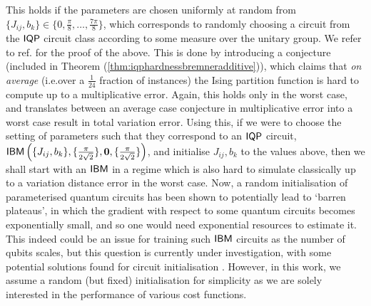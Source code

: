 This holds if the parameters are chosen uniformly at random from $\{J_{ij}, b_k\} \in\{0,\frac{\pi}{8}, \dots, \frac{7\pi}{8}\}$, which corresponds to randomly choosing a circuit from the $\operatorname{\textsf{IQP}}$ circuit class according to some measure over the unitary group. We refer to ref. for the proof of the above. This is done by introducing a conjecture (included in Theorem (\ref{thm:iqphardnessbremneradditive})), which claims that \textit{on average} (i.e.\@\@ over a $\frac{1}{24}$ fraction of instances) the Ising partition function is hard to compute up to a multiplicative error. Again, this holds only in the worst case, and translates between an average case conjecture in multiplicative error into a worst case result in total variation error. Using this, if we were to choose the setting of parameters such that they correspond to an $\operatorname{\textsf{IQP}}$ circuit, $\textsf{IBM}\left(\{J_{ij}, b_{k}\}, \{\frac{\pi}{2\sqrt{2}}\},  \mathbf{0},  \{\frac{\pi}{2\sqrt{2}}\}\right)$, and initialise $J_{ij}, b_k$ to the values above, then we shall start with an $\textsf{IBM}$ in a regime which is also hard to simulate classically up to a variation distance error in the worst case. Now, a random initialisation of parameterised quantum circuits has been shown to potentially lead to `barren plateaus', in which the gradient with respect to some quantum circuits becomes exponentially small, and so one would need exponential resources to estimate it. This indeed could be an issue for training such $\textsf{IBM}$ circuits as the number of qubits scales, but this question is currently under investigation, with some potential solutions found for circuit initialisation . However, in this work, we assume a random (but fixed) initialisation for simplicity as we are solely interested in the performance of various cost functions.



